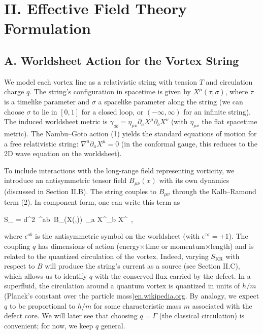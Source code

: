 \documentclass[12pt]{article}
\begin{document}
\section*{II. Effective Field Theory Formulation}

\subsection*{A. Worldsheet Action for the Vortex String}

We model each vortex line as a relativistic string with tension $T$ and circulation charge $q$. The string’s configuration in spacetime is given by $X^\mu(\tau,\sigma)$, where $\tau$ is a timelike parameter and $\sigma$ a spacelike parameter along the string (we can choose $\sigma$ to lie in $[0,1]$ for a closed loop, or $(-\infty,\infty)$ for an infinite string). The induced worldsheet metric is $\gamma_{ab} = \eta_{\mu\nu}\partial_a X^\mu \partial_b X^\nu$ (with $\eta_{\mu\nu}$ the flat spacetime metric). The Nambu–Goto action (1) yields the standard equations of motion for a free relativistic string: $\nabla^a \partial_a X^\mu = 0$ (in the conformal gauge, this reduces to the 2D wave equation on the worldsheet).


To include interactions with the long-range field representing vorticity, we introduce an antisymmetric tensor field $B_{\mu\nu}(x)$ with its own dynamics (discussed in Section II.B). The string couples to $B_{\mu\nu}$ through the Kalb–Ramond term (2). In component form, one can write this term as


S_{} =  \int d^2\sigma\, \epsilon^{ab}\, B_{\mu\nu}(X(\tau,\sigma))\, \partial_a X^\mu \partial_b X^\nu~, 


where $\epsilon^{ab}$ is the antisymmetric symbol on the worldsheet (with $\epsilon^{\tau\sigma}=+1$). The coupling $q$ has dimensions of action (energy$\times$time or momentum$\times$length) and is related to the quantized circulation of the vortex. Indeed, varying $S_{\text{KR}}$ with respect to $B$ will produce the string’s current as a source (see Section II.C), which allows us to identify $q$ with the conserved flux carried by the defect. In a superfluid, the circulation around a quantum vortex is quantized in units of $h/m$ (Planck’s constant over the particle mass)\href{https://en.wikipedia.org/wiki/Vortex_ring#:~:text=,frac%20%7B1%7D%7B4%7D%7D%5Cright}{en.wikipedia.org}. By analogy, we expect $q$ to be proportional to $h/m$ for some characteristic mass $m$ associated with the defect core. We will later see that choosing $q = \Gamma$ (the classical circulation) is convenient; for now, we keep $q$ general.
\end{document}
